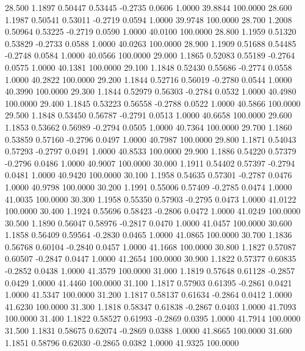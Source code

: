   28.500   1.1897   0.50447   0.53445  -0.2735   0.0606   1.0000  39.8844 100.0000
  28.600   1.1987   0.50541   0.53011  -0.2719   0.0594   1.0000  39.9748 100.0000
  28.700   1.2008   0.50964   0.53225  -0.2719   0.0590   1.0000  40.0100 100.0000
  28.800   1.1959   0.51320   0.53829  -0.2733   0.0588   1.0000  40.0263 100.0000
  28.900   1.1909   0.51688   0.54485  -0.2748   0.0584   1.0000  40.0566 100.0000
  29.000   1.1865   0.52083   0.55189  -0.2764   0.0575   1.0000  40.1381 100.0000
  29.100   1.1848   0.52430   0.55686  -0.2774   0.0558   1.0000  40.2822 100.0000
  29.200   1.1844   0.52716   0.56019  -0.2780   0.0544   1.0000  40.3990 100.0000
  29.300   1.1844   0.52979   0.56303  -0.2784   0.0532   1.0000  40.4980 100.0000
  29.400   1.1845   0.53223   0.56558  -0.2788   0.0522   1.0000  40.5866 100.0000
  29.500   1.1848   0.53450   0.56787  -0.2791   0.0513   1.0000  40.6658 100.0000
  29.600   1.1853   0.53662   0.56989  -0.2794   0.0505   1.0000  40.7364 100.0000
  29.700   1.1860   0.53859   0.57160  -0.2796   0.0497   1.0000  40.7987 100.0000
  29.800   1.1871   0.54043   0.57293  -0.2797   0.0491   1.0000  40.8533 100.0000
  29.900   1.1886   0.54220   0.57379  -0.2796   0.0486   1.0000  40.9007 100.0000
  30.000   1.1911   0.54402   0.57397  -0.2794   0.0481   1.0000  40.9420 100.0000
  30.100   1.1958   0.54635   0.57301  -0.2787   0.0476   1.0000  40.9798 100.0000
  30.200   1.1991   0.55006   0.57409  -0.2785   0.0474   1.0000  41.0035 100.0000
  30.300   1.1958   0.55350   0.57903  -0.2795   0.0473   1.0000  41.0122 100.0000
  30.400   1.1924   0.55696   0.58423  -0.2806   0.0472   1.0000  41.0249 100.0000
  30.500   1.1890   0.56047   0.58976  -0.2817   0.0470   1.0000  41.0457 100.0000
  30.600   1.1858   0.56409   0.59564  -0.2830   0.0465   1.0000  41.0865 100.0000
  30.700   1.1836   0.56768   0.60104  -0.2840   0.0457   1.0000  41.1668 100.0000
  30.800   1.1827   0.57087   0.60507  -0.2847   0.0447   1.0000  41.2654 100.0000
  30.900   1.1822   0.57377   0.60835  -0.2852   0.0438   1.0000  41.3579 100.0000
  31.000   1.1819   0.57648   0.61128  -0.2857   0.0429   1.0000  41.4460 100.0000
  31.100   1.1817   0.57903   0.61395  -0.2861   0.0421   1.0000  41.5347 100.0000
  31.200   1.1817   0.58137   0.61634  -0.2864   0.0412   1.0000  41.6230 100.0000
  31.300   1.1818   0.58347   0.61838  -0.2867   0.0403   1.0000  41.7093 100.0000
  31.400   1.1822   0.58527   0.61993  -0.2869   0.0395   1.0000  41.7914 100.0000
  31.500   1.1831   0.58675   0.62074  -0.2869   0.0388   1.0000  41.8665 100.0000
  31.600   1.1851   0.58796   0.62030  -0.2865   0.0382   1.0000  41.9325 100.0000
